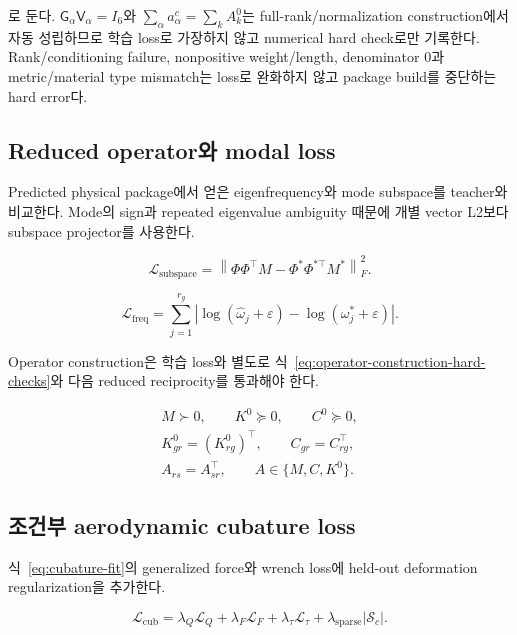 \documentclass[11pt,a4paper]{article}
\newcommand{\eps}{\varepsilon}
\begin{document}
로 둔다. \(\mathsf G_\alpha\mathsf V_\alpha=I_6\)와
\(\sum_\alpha a_\alpha^c=\sum_kA_k^0\)는 full-rank/normalization construction에서
자동 성립하므로 학습 loss로 가장하지 않고 numerical hard check로만 기록한다.
Rank/conditioning failure, nonpositive weight/length, denominator 0과 metric/material type mismatch는 loss로 완화하지 않고
package build를 중단하는 hard error다.

\subsection{Reduced operator와 modal loss}

Predicted physical package에서 얻은 eigenfrequency와 mode subspace를 teacher와 비교한다.
Mode의 sign과 repeated eigenvalue ambiguity 때문에 개별 vector L2보다 subspace projector를 사용한다.

\begin{equation}
  \mathcal L_{\mathrm{subspace}}
  =
  \left\|
  \Phi\Phi^\top M
  -
  \Phi^*\Phi^{*\top}M^*
  \right\|_F^2.
\end{equation}

\begin{equation}
  \mathcal L_{\mathrm{freq}}
  =
  \sum_{j=1}^{r_g}
  \left|
  \log(\widehat\omega_j+\eps)
  -
  \log(\omega_j^*+\eps)
  \right|.
\end{equation}

Operator construction은 학습 loss와 별도로
식~\eqref{eq:operator-construction-hard-checks}와 다음 reduced reciprocity를 통과해야 한다.

\begin{equation}
\begin{gathered}
  M\succ0,\qquad K^0\succeq0,\qquad C^0\succeq0,\\
  K_{gr}^0=(K_{rg}^0)^\top,\qquad C_{gr}=C_{rg}^\top,\\
  A_{rs}=A_{sr}^\top,\qquad A\in\{M,C,K^0\}.
\end{gathered}
\end{equation}

\subsection{조건부 aerodynamic cubature loss}

식~\eqref{eq:cubature-fit}의 generalized force와 wrench loss에
held-out deformation regularization을 추가한다.

\begin{equation}
  \mathcal L_{\mathrm{cub}}
  =
  \lambda_Q\mathcal L_Q
  +\lambda_F\mathcal L_F
  +\lambda_\tau\mathcal L_\tau
  +\lambda_{\mathrm{sparse}}|\mathcal S_c|.
\end{equation}
\end{document}
